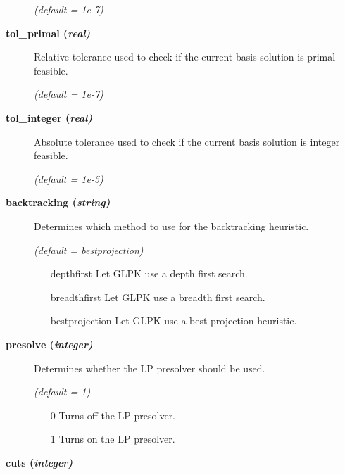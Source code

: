 \begin{description}
\textsl{(default = 1e-7)}

\item[\label{glpktol_primal}\hypertarget{glpktol_primal}
{\textbf{tol\_primal (\slshape{real})}}]\hspace{1.0in}

Relative tolerance used to check if the current basis solution is primal feasible.

\textsl{(default = 1e-7)}

\item[\label{glpktol_integer}\hypertarget{glpktol_integer}
{\textbf{tol\_integer (\slshape{real})}}]\hspace{1.0in}

Absolute tolerance used to check if the current basis solution is integer feasible.

\textsl{(default = 1e-5)}

\item[\label{backtracking}\hypertarget{backtracking}
{\textbf{backtracking (\slshape{string})}}]\hspace{1.0in}

Determines which method to use for the backtracking heuristic.

\textsl{(default = bestprojection)}
\begin{itemize}
\item[depthfirst] 
Let GLPK use a depth first search.
\item[breadthfirst] 
Let GLPK use a breadth first search.
\item[bestprojection] 
Let GLPK use a best projection heuristic.
\end{itemize}

\item[\label{glpkpresolve}\hypertarget{glpkpresolve}
{\textbf{presolve (\slshape{integer})}}]\hspace{1.0in}

Determines whether the LP presolver should be used.

\textsl{(default = 1)}
\begin{itemize}
\item[0] 
Turns off the LP presolver.
\item[1] 
Turns on the LP presolver.
\end{itemize}

\item[\label{glpkcuts}\hypertarget{glpkcuts}
{\textbf{cuts (\slshape{integer})}}]\hspace{1.0in}


\end{description}
